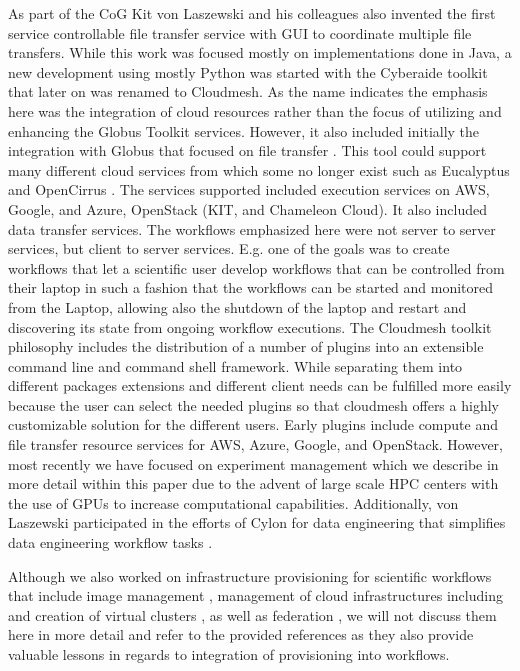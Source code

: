 \documentclass[utf8]{FrontiersinVancouver} %
\begin{document}
As part of the CoG Kit von Laszewski and his colleagues also invented the first service controllable file transfer service with GUI to coordinate multiple file transfers. While this work was focused mostly on implementations done in Java, a new development using mostly Python was started with the Cyberaide toolkit \citep{las-09-ccgrid} that later on was renamed to Cloudmesh. As the name indicates the emphasis here was the integration of cloud resources rather than the focus of utilizing and enhancing the Globus Toolkit services. However, it also included initially the integration with Globus that focused on file transfer 
\citep{las-04-ftp-journal}
\citep{las-03-ftp}.
This tool could support many different cloud services from which some no longer exist such as Eucalyptus \cite{eucalyptus} and OpenCirrus \cite{opencirrus}. The services supported included execution services on AWS, Google, and Azure, OpenStack (KIT, and Chameleon Cloud). It also included data transfer services. The workflows emphasized here were not server to server services, but client to server services. E.g. one of the goals was to create workflows that let a scientific user develop workflows that can be controlled from their laptop in such a fashion that the workflows can be started and monitored from the Laptop, allowing also the shutdown of the laptop and restart and discovering its state from ongoing workflow executions. 
The Cloudmesh toolkit \citep{las-17-cloudmesh} philosophy includes the distribution of a number of plugins into an extensible command line and command shell framework. While separating them into different packages extensions and different client needs can be fulfilled more easily because the user can select the needed plugins so that cloudmesh offers a highly customizable solution for the different users. Early plugins include compute and file transfer resource services for AWS, Azure, Google, and OpenStack. However, most recently we have focused on experiment management which we describe in more detail within this paper due to the advent of large scale HPC centers with the use of GPUs to increase computational capabilities. 
Additionally, von Laszewski participated in the efforts of Cylon for data engineering that simplifies data engineering workflow tasks \citep{cylon,cylon-radical}. 

Although we also worked on infrastructure provisioning for scientific
workflows that include image management
\citep{las-12-imagemanagement}, management of cloud infrastructures
including \citep{las-20-10gce,las-14-bigdata,las-12-fg-bookchapter}
\citep{las-17-futuregrid} and creation of virtual clusters
\citep{las-16-virtcluster,las-19-harc-comet}, as well as federation
\citep{las-08-federated-cloud}, we will not discuss them here in more
detail and refer to the provided references as they also provide
valuable lessons in regards to integration of provisioning into
workflows.
\end{document}
